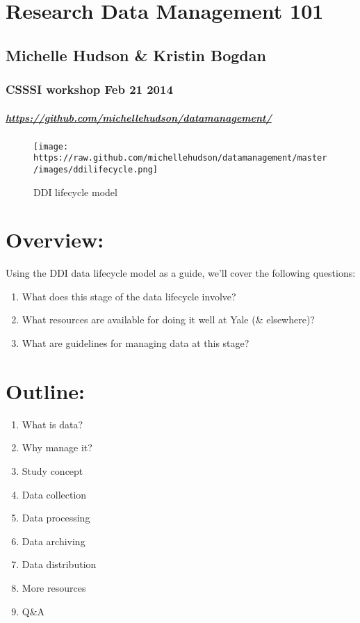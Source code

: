 \documentclass[]{article}
\author{}
\date{}
\begin{document}
\section{Research Data Management
101}\label{research-data-management-101}

\subsection{Michelle Hudson \& Kristin
Bogdan}\label{michelle-hudson-kristin-bogdan}

\subsubsection{CSSSI workshop Feb 21
2014}\label{csssi-workshop-feb-21-2014}

\subparagraph{\url{https://github.com/michellehudson/datamanagement/}}\label{httpsgithub.commichellehudsondatamanagement}

\begin{figure}[htbp]
\centering
\texttt{[image: https://raw.github.com/michellehudson/datamanagement/master/images/ddilifecycle.png]}
\caption{DDI lifecycle model}
\end{figure}

\section{Overview:}\label{overview}

Using the DDI data lifecycle model as a guide, we'll cover the following
questions:

\begin{enumerate}
\def\labelenumi{\arabic{enumi}.}
\itemsep1pt\parskip0pt
\item
  What does this stage of the data lifecycle involve?
\item
  What resources are available for doing it well at Yale (\& elsewhere)?
\item
  What are guidelines for managing data at this stage?
\end{enumerate}

\section{Outline:}\label{outline}

\begin{enumerate}
\def\labelenumi{\arabic{enumi}.}
\itemsep1pt\parskip0pt
\item
  What is data?
\item
  Why manage it?
\item
  Study concept
\item
  Data collection
\item
  Data processing
\item
  Data archiving
\item
  Data distribution
\item
  More resources
\item
  Q\&A
\end{enumerate}
\end{document}
